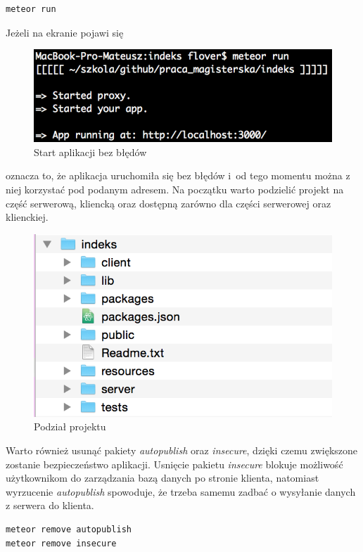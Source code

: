 \documentclass[openright]{xmgr}
\begin{document}
\begin{lstlisting}[language=bash,caption={Uruchomienie aplikacji}]
	meteor run
\end{lstlisting}

\newpage
\noindent Jeżeli na ekranie pojawi się

\begin{figure}[th!]
\centering
\includegraphics[width=0.8\hsize]{images/succesfullStart}
\caption{Start aplikacji bez błędów\label{RYS.16}}
\end{figure}

\noindent oznacza to, że aplikacja uruchomiła się bez błędów i~od tego momentu można z niej korzystać pod podanym adresem. Na początku warto podzielić projekt na część serwerową, kliencką oraz dostępną zarówno dla części serwerowej oraz klienckiej.

\begin{figure}[H]
\centering
\includegraphics[width=0.75\hsize]{images/splitProject}
\caption{Podział projektu\label{RYS.17}}
\end{figure}

Warto również usunąć pakiety \textit{autopublish} oraz \textit{insecure}, dzięki czemu zwiększone zostanie bezpieczeństwo aplikacji. Usnięcie pakietu \textit{insecure} blokuje możliwość użytkownikom do zarządzania bazą danych po stronie klienta, natomiast wyrzucenie \textit{autopublish} spowoduje, że trzeba samemu zadbać o wysyłanie danych z serwera do klienta.\cite{DiscoverMeteor2013}

\begin{lstlisting}[language=bash,caption={Usuwanie pakietów}]
meteor remove autopublish
meteor remove insecure
\end{lstlisting}
\end{document}

